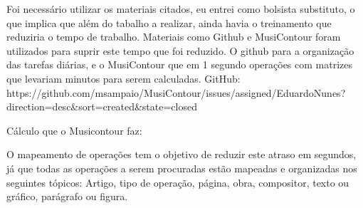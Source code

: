 \documentclass[11pt]{article}
\begin{document}
\label{sec:discussao}




Foi necessário utilizar os materiais citados, eu entrei como bolsista
substituto, o que implica que além do tabalho a realizar, ainda havia o treinamento
que reduziria o tempo de trabalho. Materiais como Github e MusiContour foram utilizados
para suprir este tempo que foi reduzido. O github para a organização das tarefas diárias, 
e o MusiContour que em 1 segundo operações com matrizes que levariam minutos para serem 
calculadas.
GitHub:
https://github.com/msampaio/MusiContour/issues/assigned/EduardoNunes?direction=desc&sort=created&state=closed

Cálculo que o Musicontour faz:


O mapeamento de operações tem o objetivo de reduzir este atraso em
segundos, já que todas as operações a serem procuradas estão mapeadas
e organizadas nos seguintes tópicos: Artigo, tipo de operação, página,
obra, compositor, texto ou gráfico, parágrafo ou figura.
\end{document}
